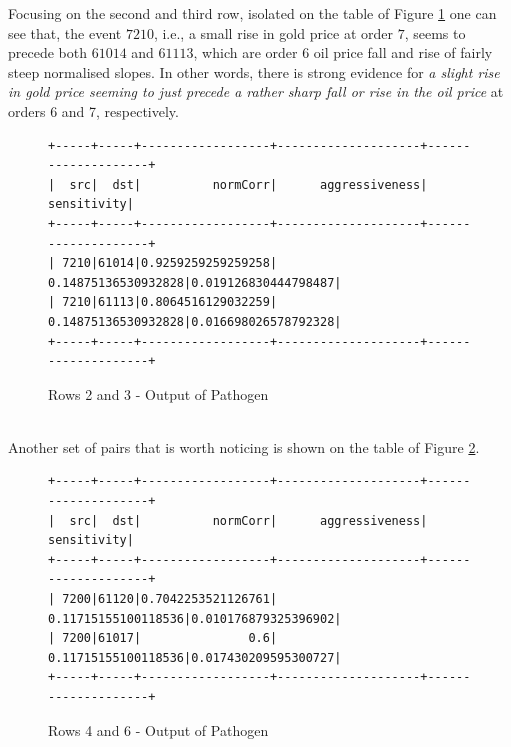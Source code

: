\documentclass[a4, 11pt]{article}
\begin{document}
Focusing on the second and third row, isolated on the table of Figure \ref{fig:graph2} one can see that, 
the event $7210$, i.e., a small rise in gold price at order $7$, seems to precede both $61014$ and $61113$, which are order $6$ oil price fall and rise of fairly steep normalised slopes. In other words, there is strong evidence for \textit{a slight rise in gold price seeming to just precede a rather sharp fall or rise in the oil price} at orders 6 and 7, respectively.
\begin{figure}[!h]
\centering
    \begin{BVerbatim}[baselinestretch=0.1,fontsize=\fontsize{12}{0}\selectfont]
+-----+-----+------------------+--------------------+--------------------+
|  src|  dst|          normCorr|      aggressiveness|         sensitivity|
+-----+-----+------------------+--------------------+--------------------+
| 7210|61014|0.9259259259259258| 0.14875136530932828|0.019126830444798487|
| 7210|61113|0.8064516129032259| 0.14875136530932828|0.016698026578792328|
+-----+-----+------------------+--------------------+--------------------+
    \end{BVerbatim}
    \caption{Rows 2 and 3 - Output of Pathogen}
    \label{fig:graph2}
\end{figure}
\\Another set of pairs that is worth noticing is shown on the table of Figure \ref{fig:graph3}.
\begin{figure}[!ht]
\centering
    \begin{BVerbatim}[baselinestretch=0.1,fontsize=\fontsize{12}{0}\selectfont]
+-----+-----+------------------+--------------------+--------------------+
|  src|  dst|          normCorr|      aggressiveness|         sensitivity|
+-----+-----+------------------+--------------------+--------------------+
| 7200|61120|0.7042253521126761| 0.11715155100118536|0.010176879325396902|
| 7200|61017|               0.6| 0.11715155100118536|0.017430209595300727|
+-----+-----+------------------+--------------------+--------------------+
    \end{BVerbatim}
    \caption{Rows 4 and 6 - Output of Pathogen}
    \label{fig:graph3}
\end{figure}
\end{document}
